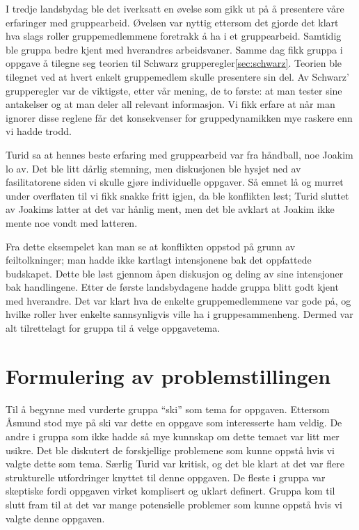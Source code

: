 I tredje landsbydag ble det iverksatt en øvelse som gikk ut på å presentere våre
erfaringer med gruppearbeid. Øvelsen var nyttig ettersom det gjorde det klart
hva slags roller gruppemedlemmene foretrakk å ha i et gruppearbeid. Samtidig ble
gruppa bedre kjent med hverandres arbeidsvaner. Samme dag fikk gruppa i oppgave
å tilegne seg teorien til Schwarz grupperegler\cref{sec:schwarz}. Teorien ble
tilegnet ved at hvert enkelt gruppemedlem skulle presentere sin del. Av
Schwarz’ grupperegler var de viktigste, etter vår mening, de to første: at
man tester sine antakelser og at man deler all relevant informasjon.  Vi fikk
erfare at når man ignorer disse reglene får det konsekvenser for
gruppedynamikken mye raskere enn vi hadde trodd.

Turid sa at hennes beste erfaring med gruppearbeid var fra håndball, noe Joakim
lo av. Det ble litt dårlig stemning, men diskusjonen ble hysjet ned av
fasilitatorene siden vi skulle gjøre individuelle oppgaver. Så emnet lå og
murret under overflaten til vi fikk snakke fritt igjen, da ble konflikten løst;
Turid sluttet av Joakims latter at det var hånlig ment, men det ble avklart at
Joakim ikke mente noe vondt med latteren.

Fra dette eksempelet kan man se at konflikten oppstod på grunn av
feiltolkninger; man hadde ikke kartlagt intensjonene bak det oppfattede
budskapet. Dette ble løst gjennom åpen diskusjon og deling av sine intensjoner
bak handlingene.  Etter de første landsbydagene hadde gruppa blitt godt kjent
med hverandre. Det var klart hva de enkelte gruppemedlemmene var gode på, og
hvilke roller hver enkelte sannsynligvis ville ha i gruppesammenheng. Dermed var
alt tilrettelagt for gruppa til å velge oppgavetema.

\section{Formulering av problemstillingen}
Til å begynne med vurderte gruppa ``ski'' som tema for oppgaven. Ettersom Åsmund
stod mye på ski var dette en oppgave som interesserte ham veldig. De andre i
gruppa som ikke hadde så mye kunnskap om dette temaet var litt mer usikre. Det
ble diskutert de forskjellige problemene som kunne oppstå hvis vi valgte dette
som tema. Særlig Turid var kritisk, og det ble klart at det var flere
strukturelle utfordringer knyttet til denne oppgaven. De fleste i gruppa var
skeptiske fordi oppgaven virket komplisert og uklart definert. Gruppa kom til
slutt fram til at det var mange potensielle problemer som kunne oppstå hvis vi
valgte denne oppgaven.

